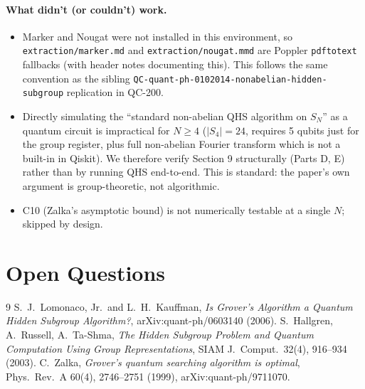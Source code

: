 \documentclass[11pt]{article}
\begin{document}
\paragraph{What didn't (or couldn't) work.}
\begin{itemize}
\item Marker and Nougat were not installed in this environment, so
      \texttt{extraction/marker.md} and \texttt{extraction/nougat.mmd} are
      Poppler \texttt{pdftotext} fallbacks (with header notes documenting
      this).  This follows the same convention as the sibling
      \texttt{QC-quant-ph-0102014-nonabelian-hidden-subgroup} replication
      in QC-200.
\item Directly simulating the ``standard non-abelian QHS algorithm on
      $S_N$'' as a quantum circuit is impractical for $N\ge 4$
      ($|S_4|=24$, requires 5 qubits just for the group register, plus
      full non-abelian Fourier transform which is not a built-in in
      Qiskit).  We therefore verify Section 9 structurally (Parts D, E)
      rather than by running QHS end-to-end.  This is standard: the
      paper's own argument is group-theoretic, not algorithmic.
\item C10 (Zalka's asymptotic bound) is not numerically testable at a
      single $N$; skipped by design.
\end{itemize}

\section{Open Questions}


\begin{thebibliography}{9}
 S.~J.~Lomonaco, Jr.~and L.~H.~Kauffman, \emph{Is Grover's
Algorithm a Quantum Hidden Subgroup Algorithm?}, arXiv:quant-ph/0603140
(2006).
 S.~Hallgren, A.~Russell, A.~Ta-Shma, \emph{The Hidden
Subgroup Problem and Quantum Computation Using Group Representations},
SIAM J.~Comput.~32(4), 916--934 (2003).
 C.~Zalka, \emph{Grover's quantum searching algorithm is
optimal}, Phys.~Rev.~A 60(4), 2746--2751 (1999),
arXiv:quant-ph/9711070.
\end{thebibliography}
\end{document}
